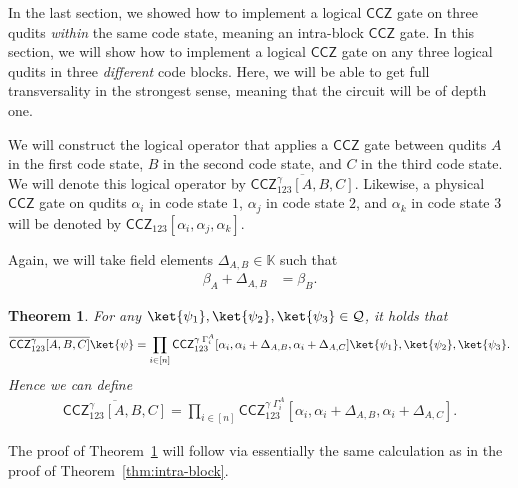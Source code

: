 \documentclass[11pt]{article}
\newtheorem{theorem}{Theorem}[section]
\theoremstyle{definition}
\newcommand{\CCZ}{\mathsf{CCZ}}
\newcommand{\qcode}{\mathcal{Q}}
\newcommand{\KK}{\mathbb{K}}
\newcommand*{\ol}{\overline}
\begin{document}
In the last section, we showed how to implement a logical $\CCZ$ gate on three qudits \emph{within} the same code state, meaning an intra-block $\CCZ$ gate. In this section, we will show how to implement a logical $\CCZ$ gate on any three logical qudits in three \emph{different} code blocks. Here, we will be able to get full transversality in the strongest sense, meaning that the circuit will be of depth one.

We will construct the logical operator that applies a $\CCZ$ gate between qudits $A$ in the first code state, $B$ in the second code state, and $C$ in the third code state. We will denote this logical operator by $\ol{\CCZ_{123}^\gamma[A, B, C]}$. Likewise, a physical $\CCZ$ gate on qudits $\alpha_i$ in code state $1$, $\alpha_j$ in code state $2$, and $\alpha_k$ in code state $3$ will be denoted by $\CCZ_{123}[\alpha_i, \alpha_j, \alpha_k]$.

Again, we will take field elements $\Delta_{A,B} \in \KK$ such that
\begin{align}
    \beta_A + \Delta_{A,B} &= \beta_B.
\end{align}

\begin{theorem} \label{thm:inter-block}
    For any $\ket{\psi_1}, \ket{\psi_2}, \ket{\psi_3} \in \qcode$, it holds that
    \begin{align}
        \ol{\CCZ_{123}^\gamma[A,B,C]} \ket{\psi} 
        = \prod_{i \in [n]} \CCZ_{123}^{\gamma\;\Gamma^A_i}[\alpha_i, \alpha_i + \Delta_{A,B}, \alpha_i + \Delta_{A,C}] \ket{\psi_1}, \ket{\psi_2}, \ket{\psi_3}.
    \end{align}
    Hence we can define
    \begin{align}
        \ol{\CCZ^\gamma_{123}[A,B,C]} 
        = \prod_{i \in [n]} \CCZ_{123}^{\gamma\;\Gamma^A_i}[\alpha_i, \alpha_i + \Delta_{A,B}, \alpha_i + \Delta_{A,C}]. \label{eqn:inter-CCZ-def}
    \end{align}
\end{theorem}

The proof of Theorem~\ref{thm:inter-block} will follow via essentially the same calculation as in the proof of Theorem~\ref{thm:intra-block}. 
\end{document}
